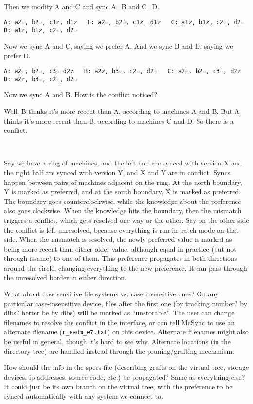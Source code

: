\documentclass{book}
\begin{document}
Then we modify A and C and sync A=B and C=D.

\verb+A: a2=, b2=, c1≠, d1≠   B: a2=, b2=, c1≠, d1≠   C: a1≠, b1≠, c2=, d2=   D: a1≠, b1≠, c2=, d2=+

Now we sync A and C, saying we prefer A.  And we sync B and D, saying we prefer D.

\verb+A: a2=, b2=, c3= d2≠   B: a2≠, b3=, c2=, d2=   C: a2=, b2=, c3=, d2≠   D: a2≠, b3=, c2=, d2=+

Now we sync A and B.  How is the conflict noticed?

Well, B thinks it's more recent than A, according to machines A and B.  But A thinks it's more recent than B, according to machines C and D.  So there is a conflict.

~

Say we have a ring of machines, and the left half are synced with version X and the right half are synced with version Y, and X and Y are in conflict.  Syncs happen between pairs of machines adjacent on the ring.  At the north boundary, Y is marked as preferred, and at the south boundary, X is marked as preferred.  The boundary goes counterclockwise, while the knowledge about the preference also goes clockwise.  When the knowledge hits the boundary, then the mismatch triggers a conflict, which gets resolved one way or the other.  Say on the other side the conflict is left unresolved, because everything is run in batch mode on that side.  When the mismatch is resolved, the newly preferred value is marked as being more recent than either older value, although equal in practice (but not through issame) to one of them.  This preference propagates in both directions around the circle, changing everything to the new preference.  It can pass through the unresolved border in either direction.

What about case sensitive file systems vs. case insensitive ones?
On any particular case-insensitive device, files after the first one (by tracking number? by dibs? better be by dibs) will be marked as ``unstorable''.  The user can change filenames to resolve the conflict in the interface, or can tell McSync to use an alternate filename (\verb+r_eadm_e7.txt+) on this device.  Alternate filenames might also be useful in general, though it's hard to see why.  Alternate locations (in the directory tree) are handled instead through the pruning/grafting mechanism.

How should the info in the specs file (describing grafts on the virtual tree, storage devices, ip addresses, source code, etc.) be propagated?  Same as everything else?  It could just be its own branch on the virtual tree, with the preference to be synced automatically with any system we connect to.
\end{document}
